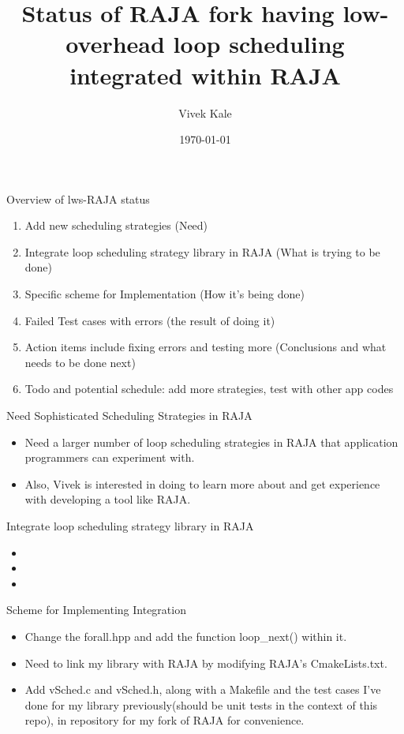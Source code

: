 \documentclass{beamer}
\title{Status of RAJA fork having low-overhead loop scheduling integrated within RAJA}
\author{Vivek Kale}
\date{\today}
\begin{document}
 

\begin{frame}

\titlepage

\end{frame}

\begin{frame}[label=ovwlwsRAJAstatus]{Overview of lws-RAJA status}
\begin{enumerate} 
\item Add new scheduling strategies (Need)
\item Integrate loop scheduling strategy library in RAJA (What is trying to be done)
\item Specific scheme for Implementation (How it's being done)
\item Failed Test cases with errors (the result of doing it) 
\item Action items include fixing errors and testing more (Conclusions and what needs to be done next)
\item Todo and potential schedule: add more strategies, test with other app codes
\end{enumerate}
\end{frame}

\begin{frame}{Need Sophisticated Scheduling Strategies in RAJA}
\begin{itemize}
\item Need a larger number of loop scheduling strategies in RAJA that application programmers can experiment with.
\item Also, Vivek is interested in doing to learn more about and get experience with developing a tool like RAJA. 
\end{itemize} 
\end{frame}


\begin{frame}{Integrate loop scheduling strategy library in RAJA}
\begin{itemize}
\item 
\item 
\item
\end{itemize} 
\end{frame}

\begin{frame}{Scheme for Implementing Integration}
\begin{itemize}
\item Change the forall.hpp and add the function loop\_next() within it. 
\item Need to link my library with RAJA by modifying RAJA's CmakeLists.txt. 
\item Add vSched.c and vSched.h, along with a Makefile and the test cases I've done for my library previously(should be unit tests in the context of this repo), in repository for my fork of RAJA for convenience.
\end{itemize}

\end{frame}
\end{document}
